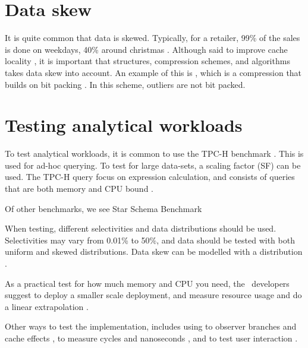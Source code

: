 %
%

\section{Data skew}
\label{sec:Data skew}
It is quite common that data is skewed. Typically, for a retailer, 99\% of the sales is done on weekdays, 40\% around christmas \cite{Raman2008-gi}. Although said to improve cache locality \cite{Larson2013-mc}, it is important that structures, compression schemes, and algorithms takes data skew into account. An example of this is , which is a compression that builds on bit packing \cite{Bjorklund2011-wh}. In this scheme, outliers are not bit packed.


\section{Testing analytical workloads}
\label{sec:Testing analytical workloads}
To test analytical workloads, it is common to use the TPC-H benchmark \cite{Boncz2002-yj}. This is used for ad-hoc querying. To test for large data-sets, a scaling factor (SF) can be used. The TPC-H query focus on expression calculation, and consists of queries that are both memory and CPU bound \cite{Boncz2005-wj}.

Of other benchmarks, we see Star Schema Benchmark \cite{Boncz2002-yj}

When testing, different selectivities and data distributions should be used. Selectivities may vary from 0.01\% to 50\%, and data should be tested with both uniform and skewed distributions. Data skew can be modelled with a  distribution \cite{Holloway2008-rr}.

As a practical test for how much memory and CPU you need, the \qlikview~developers suggest to deploy a smaller scale deployment, and measure resource usage and do a linear extrapolation \cite{Qlik2011-yc}.

Other ways to test the implementation, includes using  to observer branches and cache effects \cite{Neumann2011-uq},  to measure cycles and nanoseconds \cite{Willhalm2013-ri}, and  to test user interaction \cite{Qlik2012-ku}.


